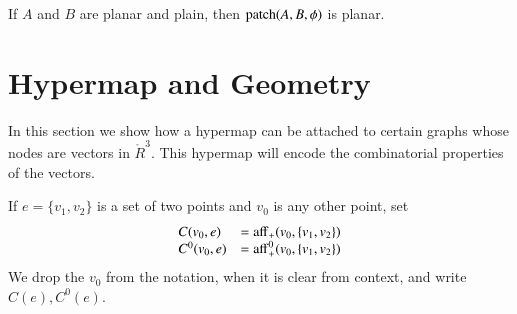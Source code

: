 \begin{lemma} If $A$ and $B$ are planar and plain, then
    ${\operatorname{patch}}(A,B,\phi)$ is planar.
\end{lemma}




\chapter{Hypermap and Geometry}

In this section we show how a hypermap can be attached to certain
graphs whose nodes are vectors in $\ring{R}^3$. This hypermap will
encode the combinatorial properties of the vectors.



If $e=\{v_1,v_2\}$ is a set of two points and $v_0$ is any other point,
set
  $$
  \begin{array}{lll}
  C(v_0,e) &= {\operatorname{aff}}_+(v_0,\{v_1,v_2\})\\
  C^0(v_0,e) &= {\operatorname{aff}}^0_+(v_0,\{v_1,v_2\})\\
  \end{array}
  $$
We drop the $v_0$ from the notation, when it is clear from context,
and write $C(e), C^0(e)$.


